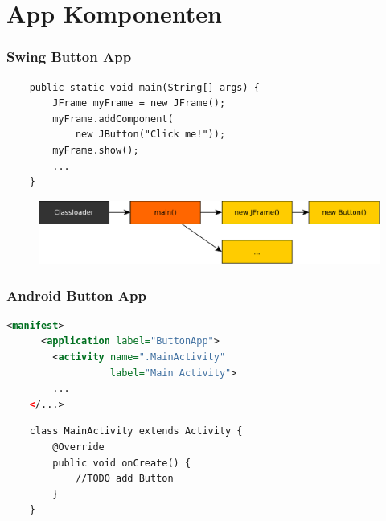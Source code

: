 \section{App Komponenten}


\begin{frame}[c,fragile]
	\frametitle{Swing Button App}
	\begin{lstlisting}
	public static void main(String[] args) {
	    JFrame myFrame = new JFrame();
	    myFrame.addComponent(
	        new JButton("Click me!"));
	    myFrame.show();
	    ...
	}
	\end{lstlisting}
	\pause \vspace{0.5cm}
	\begin{figure}
	\includegraphics[width=\textwidth]{pictures/call-hierchy-swing.pdf}
	\end{figure}
\end{frame}


\begin{frame}[c,fragile]
	\frametitle{Android Button App}
	\begin{lstlisting}[language=XML]
	<manifest>
	  <application label="ButtonApp">
	    <activity name=".MainActivity" 
	              label="Main Activity">
        ...
	</...>
	\end{lstlisting}
	\pause \vspace{0.5cm}
	\begin{lstlisting}
	class MainActivity extends Activity {
	    @Override
	    public void onCreate() {
	        //TODO add Button
	    }
	}
	\end{lstlisting}
\end{frame}

